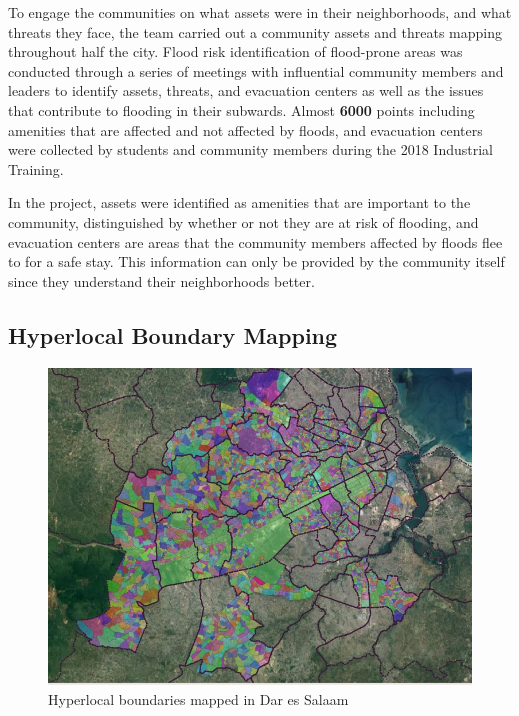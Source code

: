 \documentclass[a4paper,12pt,twoside]{article}
\begin{document}
\begin{multicols}{2}
To engage the communities on what assets were in their neighborhoods, and what threats they face, the team carried out a community assets and threats mapping throughout half the city. Flood risk identification of flood-prone areas was conducted through a series of meetings with influential community members and leaders to identify assets, threats, and evacuation centers as well as the issues that contribute to flooding in their subwards. Almost \textbf{6000} points including amenities that are affected and not affected by floods, and evacuation centers were collected by students and community members during the 2018 Industrial Training.

In the project, assets were identified as amenities that are important to the community, distinguished by whether or not they are  at risk of flooding, and evacuation centers are areas that the community members affected by floods flee to for a safe stay. This information can only be provided by the community itself since they understand their neighborhoods better.
\end{multicols}

\newpage
\subsection{Hyperlocal Boundary Mapping}
\begin{figure}[h]
    \centering
    \includegraphics[width=.75\textwidth]{images/shinaexample.jpeg}
    \caption{Hyperlocal boundaries mapped in Dar es Salaam}
\end{figure}
\end{document}
